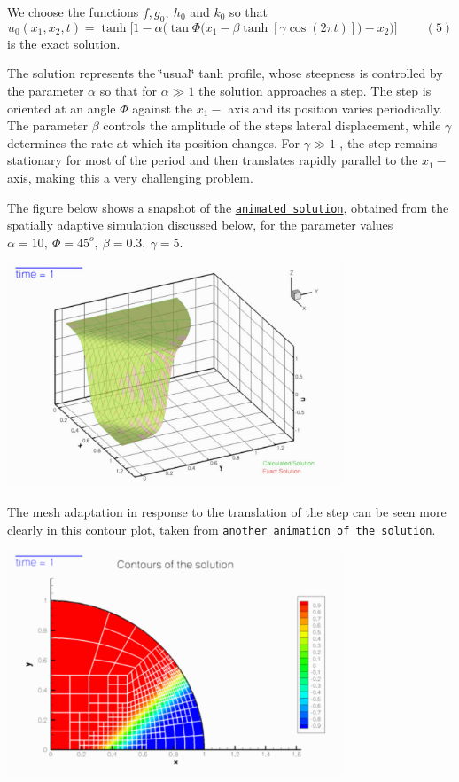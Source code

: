 We choose the functions $ f, g_0, \ h_0$ and $ k_0$ so that \[ u_0(x_1,x_2,t) = \tanh\bigg[1-\alpha\bigg(\tan\Phi \big(x_1-\beta\tanh[ \gamma\cos\left(2\pi t\right)]\big)- x_2\bigg)\bigg] \ \ \ \ \ \ \ \ \ \ (5) \] is the exact solution.

The solution represents the \char`\"{}usual\char`\"{} tanh profile, whose steepness is controlled by the parameter $ \alpha $ so that for $ \alpha \gg 1 $ the solution approaches a step. The step is oriented at an angle $ \Phi $ against the $ x_1-$ axis and its position varies periodically. The parameter $ \beta $ controls the amplitude of the step\textquotesingle{}s lateral displacement, while $ \gamma $ determines the rate at which its position changes. For $ \gamma \gg 1 $ , the step remains stationary for most of the period and then translates rapidly parallel to the $ x_1- $ axis, making this a very challenging problem.

The figure below shows a snapshot of the \href{../figures/step_soln.avi}{\tt animated solution}, obtained from the spatially adaptive simulation discussed below, for the parameter values $ \alpha=10, \ \Phi=45^o, \ \beta=0.3, \ \gamma=5. $

 
\begin{DoxyImage}
\includegraphics[width=0.75\textwidth]{step_soln}
\end{DoxyImage}


The mesh adaptation in response to the translation of the step can be seen more clearly in this contour plot, taken from \href{../figures/unsteady_heat_contour.avi}{\tt another animation of the solution}.

 
\begin{DoxyImage}
\includegraphics[width=0.75\textwidth]{unsteady_heat_contour}
\end{DoxyImage}




